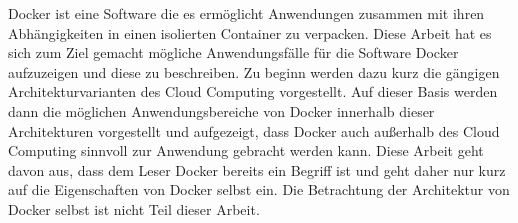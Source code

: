 \label{sec:zusammenfassung}
Docker ist eine Software die es ermöglicht Anwendungen zusammen mit ihren Abhängigkeiten in einen isolierten Container zu verpacken.
Diese Arbeit hat es sich zum Ziel gemacht mögliche Anwendungsfälle für die Software Docker aufzuzeigen und diese zu beschreiben.
Zu beginn werden dazu kurz die gängigen Architekturvarianten des Cloud Computing vorgestellt.
Auf dieser Basis werden dann die möglichen Anwendungsbereiche von Docker innerhalb dieser Architekturen vorgestellt und aufgezeigt, dass Docker auch außerhalb des Cloud Computing sinnvoll zur Anwendung gebracht werden kann.
Diese Arbeit geht davon aus, dass dem Leser Docker bereits ein Begriff ist und geht daher nur kurz auf 
die Eigenschaften von Docker selbst ein. Die Betrachtung der Architektur von Docker selbst ist nicht Teil dieser Arbeit.

